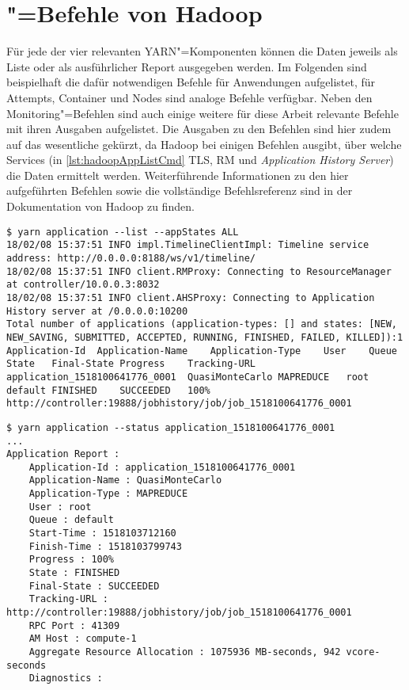 \chapter{"=Befehle von Hadoop}
\label{app:hadoopCmds}

Für jede der vier relevanten YARN"=Komponenten können die Daten jeweils als Liste oder als ausführlicher Report ausgegeben werden.
Im Folgenden sind beispielhaft die dafür notwendigen Befehle für Anwendungen aufgelistet, für Attempts, Container und Nodes sind analoge Befehle verfügbar.
Neben den Monitoring"=Befehlen sind auch einige weitere für diese Arbeit relevante Befehle mit ihren Ausgaben aufgelistet.
Die Ausgaben zu den Befehlen sind hier zudem auf das wesentliche gekürzt, \uA da Hadoop bei einigen Befehlen ausgibt, über welche Services (in \cref{lst:hadoopAppListCmd} \zB \gls{TLS}, \gls{RM} und \emph{Application History Server}) die Daten ermittelt werden.
Weiterführende Informationen zu den hier aufgeführten Befehlen sowie die vollständige Befehlsreferenz sind in der Dokumentation von Hadoop \cite{HadoopYarnCmds271} zu finden.

\begin{lstlisting}[label=lst:hadoopAppListCmd,style=plain,
caption={[\acrshort{CLI}"=Ausgabe der Anwendungsliste]
    \acrshort{CLI}"=Ausgabe der Anwendungsliste.
    Anwendungen können mithilfe der Optionen \mbox{\texttt{-{}-appTypes}} und \mbox{\texttt{-{}-appStates}} gefiltert werden.}]
$ yarn application --list --appStates ALL
18/02/08 15:37:51 INFO impl.TimelineClientImpl: Timeline service address: http://0.0.0.0:8188/ws/v1/timeline/
18/02/08 15:37:51 INFO client.RMProxy: Connecting to ResourceManager at controller/10.0.0.3:8032
18/02/08 15:37:51 INFO client.AHSProxy: Connecting to Application History server at /0.0.0.0:10200
Total number of applications (application-types: [] and states: [NEW, NEW_SAVING, SUBMITTED, ACCEPTED, RUNNING, FINISHED, FAILED, KILLED]):1
Application-Id	Application-Name	Application-Type	User	Queue	State	Final-State	Progress	Tracking-URL
application_1518100641776_0001	QuasiMonteCarlo	MAPREDUCE	root	default	FINISHED	SUCCEEDED	100%	http://controller:19888/jobhistory/job/job_1518100641776_0001
\end{lstlisting}

\begin{lstlisting}[label=lst:hadoopAppDetailsCmd,style=plain,
caption={\acrshort{CLI}"=Ausgabe des Reports einer Anwendung}]
$ yarn application --status application_1518100641776_0001
...
Application Report : 
    Application-Id : application_1518100641776_0001
    Application-Name : QuasiMonteCarlo
    Application-Type : MAPREDUCE
    User : root
    Queue : default
    Start-Time : 1518103712160
    Finish-Time : 1518103799743
    Progress : 100%
    State : FINISHED
    Final-State : SUCCEEDED
    Tracking-URL : http://controller:19888/jobhistory/job/job_1518100641776_0001
    RPC Port : 41309
    AM Host : compute-1
    Aggregate Resource Allocation : 1075936 MB-seconds, 942 vcore-seconds
    Diagnostics :
\end{lstlisting}

